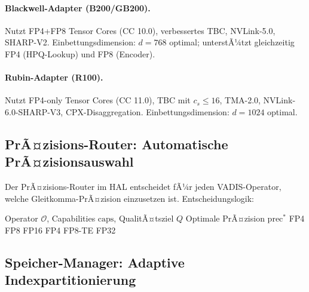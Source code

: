 ﻿\documentclass[12pt,a4paper]{article}
\begin{document}
\paragraph{Blackwell-Adapter (B200/GB200).}
Nutzt FP4+FP8 Tensor Cores (CC 10.0), verbes\-sertes TBC,
NVLink-5.0, SHARP-V2. Einbettungsdimension: $d = 768$ optimal;
unterstÃ¼tzt gleichzeitig FP4 (HPQ-Lookup) und FP8 (Encoder).

\paragraph{Rubin-Adapter (R100).}
Nutzt FP4-only Tensor Cores (CC 11.0), TBC mit $c_s \leq 16$,
TMA-2.0, NVLink-6.0-SHARP-V3, CPX-Disaggregation.
Einbettungsdimension: $d = 1024$ optimal.

\subsection{PrÃ¤zisions-Router: Automatische PrÃ¤zisionsauswahl}
\label{sub:precision_router}

Der PrÃ¤zisions-Router im HAL entscheidet fÃ¼r jeden VADIS-Operator,
welche Gleitkomma-PrÃ¤zision einzusetzen ist. Entscheidungslogik:

\begin{algorithm}[ht]
\small
\caption{VADIS-PrÃ¤zisions-Router}
\label{alg:prec_router}
\begin{algorithmic}[1]
\Require Operator $\mathcal{O}$, Capabilities $\text{caps}$, QualitÃ¤tsziel $Q$
\Ensure Optimale PrÃ¤zision $\text{prec}^*$
    \Return FP4 \quad {}
    \Return FP8 \quad {}
  \Else
    \Return FP16
  \EndIf
{}
    \Return FP4 
    \Return FP8-TE 
  \EndIf
{}
  \Return FP32 \quad {}
\EndIf
\end{algorithmic}
\end{algorithm}

\subsection{Speicher-Manager: Adaptive Indexpartitionierung}
\label{sub:memory_manager}
\end{document}
